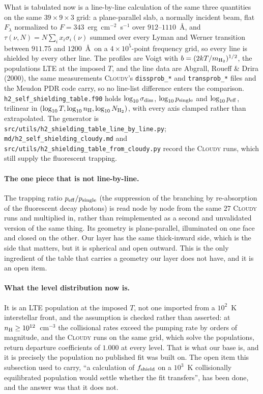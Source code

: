 \documentclass[english,a4paper]{my_memo}
\begin{document}
What is tabulated now is a line-by-line calculation of the same three
quantities on the same $39 \times 9 \times 3$ grid: a plane-parallel slab, a
normally incident beam, flat $F_\lambda$ normalized to
$F = 343$~erg~cm$^{-2}$~s$^{-1}$ over $912$--$1110$~\AA, and
$\tau(\nu, N) = N \sum_i x_i \sigma_i(\nu)$ summed over every Lyman and Werner
transition between $911.75$ and $1200$~\AA\ on a $4\times10^{5}$-point
frequency grid, so every line is shielded by every other line. The profiles
are Voigt with $b = (2kT/m_{\rm H_2})^{1/2}$, the populations LTE at the
imposed $T$, and the line data are Abgrall, Roueff \& Drira (2000), the same
measurements \textsc{Cloudy}'s \texttt{dissprob\_*} and \texttt{transprob\_*}
files and the Meudon PDR code carry, so no line-list difference enters the
comparison. \texttt{h2\_self\_shielding\_table.f90} holds
$\log_{10}\sigma_{\rm diss}$, $\log_{10} p_{\rm single}$ and
$\log_{10} p_{\rm eff}$, trilinear in
$(\log_{10} T, \log_{10} n_{\rm H}, \log_{10} N_{\rm H_2})$, with every axis
clamped rather than extrapolated. The generator is
\texttt{src/utils/h2\_shielding\_table\_line\_by\_line.py};
\texttt{md/h2\_self\_shielding\_cloudy.md} and
\texttt{src/utils/h2\_shielding\_table\_from\_cloudy.py} record the
\textsc{Cloudy} runs, which still supply the fluorescent trapping.

\paragraph{The one piece that is not line-by-line.} The trapping ratio
$p_{\rm eff}/p_{\rm single}$ (the suppression of the branching by
re-absorption of the fluorescent decay photons) is read node by node from
the same $27$ \textsc{Cloudy} runs and multiplied in, rather than
reimplemented as a second and unvalidated version of the same thing. Its
geometry is plane-parallel, illuminated on one face and closed on the other.
Our layer has the same thick-inward side, which is the side that matters, but
it is spherical and open outward. This is the only ingredient of the table
that carries a geometry our layer does not have, and it is an open item.

\paragraph{What the level distribution now is.} It is an LTE population at the
imposed $T$, not one imported from a $10^{2}$~K interstellar front, and the
assumption is checked rather than asserted: at $n_{\rm H} \geq
10^{12}$~cm$^{-3}$ the collisional rates exceed the pumping rate by orders of
magnitude, and the \textsc{Cloudy} runs on the same grid, which solve the
populations, return departure coefficients of $1.000$ at every level. That is
what our base is, and it is precisely the population no published fit was
built on. The open item this subsection used to carry, ``a calculation of
$f_{\rm shield}$ on a $10^{3}$~K collisionally equilibrated population would
settle whether the fit transfers'', has been done, and the answer was that it
does not.
\end{document}
